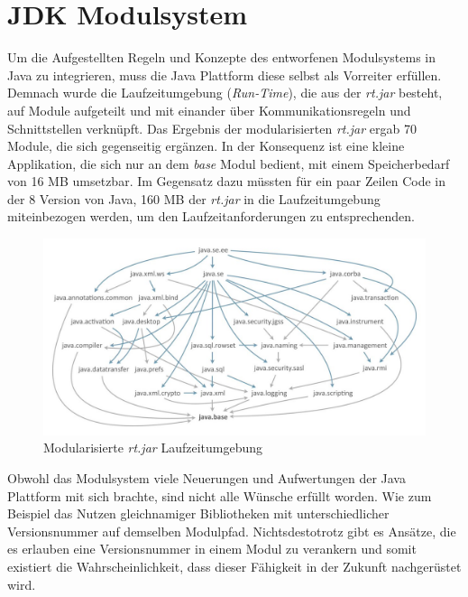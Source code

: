 \section{JDK Modulsystem} \label{sec:modular_java_base}
  Um die Aufgestellten Regeln und Konzepte des entworfenen Modulsystems in Java zu integrieren, muss die Java Plattform diese selbst als Vorreiter erfüllen. \bigbreak
  Demnach wurde die Laufzeitumgebung (\textit{Run-Time}), die aus der \textit{rt.jar} besteht, auf Module aufgeteilt und mit einander über Kommunikationsregeln und Schnittstellen verknüpft. Das Ergebnis der modularisierten \textit{rt.jar} ergab 70 Module, die sich gegenseitig ergänzen. \newline
  In der Konsequenz ist eine kleine Applikation, die sich nur an dem \textit{base} Modul bedient, mit einem Speicherbedarf von 16 MB umsetzbar. Im Gegensatz dazu müssten für ein paar Zeilen Code in der 8 Version von Java, 160 MB der \textit{rt.jar} in die Laufzeitumgebung miteinbezogen werden, um den Laufzeitanforderungen zu entsprechenden.\bigbreak
  \begin{figure}[h!]
   \centering
   \includegraphics[width=\textwidth]{material/images/moduleGraph.jpg}
   \caption{Modularisierte \textit{rt.jar} Laufzeitumgebung \cite{modGraph}}
   \label{fig:jdk}
  \end{figure}
  Obwohl das Modulsystem viele Neuerungen und Aufwertungen der Java Plattform mit sich brachte, sind nicht alle Wünsche erfüllt worden. Wie zum Beispiel das Nutzen gleichnamiger Bibliotheken mit unterschiedlicher Versionsnummer auf demselben Modulpfad.\newline
  Nichtsdestotrotz gibt es Ansätze, die es erlauben eine Versionsnummer in einem Modul zu verankern und somit existiert die Wahrscheinlichkeit, dass dieser Fähigkeit in der Zukunft nachgerüstet wird. 
 

